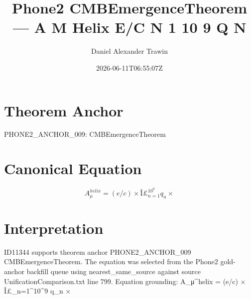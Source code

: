 \documentclass[11pt]{article}
\title{Phone2 CMBEmergenceTheorem — A Μ Helix E/C N 1 10 9 Q N}
\author{Daniel Alexander Trawin}
\date{2026-06-11T06:55:07Z}
\begin{document}
\maketitle
\section*{Theorem Anchor}
PHONE2_ANCHOR_009: CMBEmergenceTheorem
\section*{Canonical Equation}
\[
A_μ^{helix} = (e/c) × Î£_{n=1}^{10^9} q_n ×
\]
\section*{Interpretation}
ID11344 supports theorem anchor PHONE2_ANCHOR_009 CMBEmergenceTheorem. The equation was selected from the Phone2 gold-anchor backfill queue using nearest_same_source against source UnificationComparison.txt line 799. Equation grounding: A_μ^{helix} = (e/c) × Î£_{n=1}^{10^9} q_n ×
\end{document}
